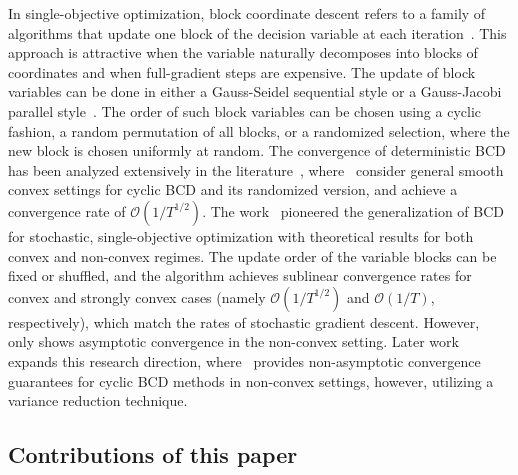 \documentclass[11pt,a4paper]{article}
\numberwithin{equation}{section}%
\renewcommand{\(}{\left (}
\renewcommand{\)}{\right )}
\begin{document}
In single-objective optimization, block coordinate descent refers to a family of algorithms that update one block of the decision variable at each iteration~\cite{wright2015coordinate,shi2016primer,ABeck_LTetruashvili_2013,JLiu_etal_2014}. This approach is attractive when the variable naturally decomposes into blocks of coordinates and when full-gradient steps are expensive. The update of block variables can be done in either a Gauss-Seidel sequential style or a Gauss-Jacobi parallel style~\cite{ABeck_LTetruashvili_2013,JLiu_etal_2014,cai2023cyclic}. %
The order of such block variables can be chosen using a cyclic fashion, a random permutation of all blocks, or a randomized selection, where the new block is chosen uniformly at random. 
The convergence of deterministic BCD has been analyzed extensively in the literature~\cite{luo1992convergence,blockGauss-Seidel,razaviyayn2013unified,Nesterov2012EfficiencyOC,ABeck_LTetruashvili_2013,wen2012block}, where~\cite{Nesterov2012EfficiencyOC, ABeck_LTetruashvili_2013} consider general smooth convex settings for cyclic BCD and its randomized version, and achieve a convergence rate of $\mathcal{O}(1/T^{1/2})$.
The work~\cite{xu2015blockstochasticgradientiteration} pioneered the generalization of BCD for stochastic, single-objective optimization with theoretical results for both convex and non-convex regimes. The update order of the variable blocks can be fixed or shuffled, and the algorithm achieves sublinear convergence rates for convex and strongly convex  cases (namely $\mathcal{O}(1/T^{1/2})$ and $\mathcal{O}(1/T)$, respectively), which match the rates of stochastic gradient descent. However,~\cite{xu2015blockstochasticgradientiteration} only shows asymptotic convergence in the non-convex setting.  Later work~\cite{cuevas2017cyclic,jiang2025stochastic,yu2019zeroth,driggs2021stochastic,yang2019inexact,cai2023cyclic} expands this research direction, where~\cite{cai2023cyclic} provides non-asymptotic convergence guarantees for cyclic BCD methods in non-convex settings, however, utilizing a variance reduction technique.

\subsection{Contributions of this paper}
\end{document}
